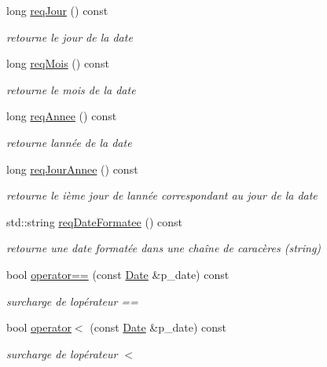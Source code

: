 \begin{DoxyCompactItemize}
long \hyperlink{classutil_1_1Date_aa2b8c7a6e23e9244a5bac8342484d3b8}{req\+Jour} () const
\begin{DoxyCompactList}\small\item\em retourne le jour de la date \end{DoxyCompactList}\item 
long \hyperlink{classutil_1_1Date_a8002c391b812945da68b16cb4a424460}{req\+Mois} () const
\begin{DoxyCompactList}\small\item\em retourne le mois de la date \end{DoxyCompactList}\item 
long \hyperlink{classutil_1_1Date_aa7c4b428456da55a2e3769e93ad9bb8d}{req\+Annee} () const
\begin{DoxyCompactList}\small\item\em retourne l\textquotesingle{}année de la date \end{DoxyCompactList}\item 
long \hyperlink{classutil_1_1Date_a9e76af410b6be9ac4ea9ab4df5797847}{req\+Jour\+Annee} () const
\begin{DoxyCompactList}\small\item\em retourne le ième jour de l\textquotesingle{}année correspondant au jour de la date \end{DoxyCompactList}\item 
std\+::string \hyperlink{classutil_1_1Date_ad92d1e9c4d570c5f31a8e06cf2e1ae8c}{req\+Date\+Formatee} () const
\begin{DoxyCompactList}\small\item\em retourne une date formatée dans une chaîne de caracères (string) \end{DoxyCompactList}\item 
bool \hyperlink{classutil_1_1Date_a8114f8e40cee24e1d7a58b910e8f4637}{operator==} (const \hyperlink{classutil_1_1Date}{Date} \&p\+\_\+date) const
\begin{DoxyCompactList}\small\item\em surcharge de l\textquotesingle{}opérateur == \end{DoxyCompactList}\item 
bool \hyperlink{classutil_1_1Date_aefcf8a7520711f783fb0241d460480c5}{operator$<$} (const \hyperlink{classutil_1_1Date}{Date} \&p\+\_\+date) const
\begin{DoxyCompactList}\small\item\em surcharge de l\textquotesingle{}opérateur $<$ \end{DoxyCompactList}\item 

\end{DoxyCompactItemize}

